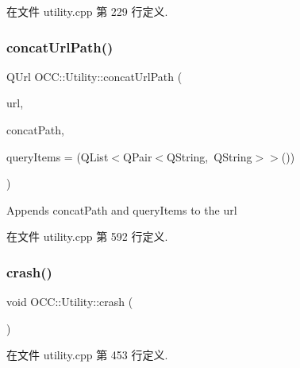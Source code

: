 在文件 utility.\+cpp 第 229 行定义.

\mbox{\label{namespace_o_c_c_1_1_utility_a3032e9927bf9de22576b940b1770008d}} 
\subsubsection{\texorpdfstring{concat\+Url\+Path()}{concatUrlPath()}}
{\footnotesize\ttfamily Q\+Url O\+C\+C\+::\+Utility\+::concat\+Url\+Path (\begin{DoxyParamCaption}\item[{const Q\+Url \&}]{url,  }\item[{const Q\+String \&}]{concat\+Path,  }\item[{const Q\+List$<$ Q\+Pair$<$ Q\+String, Q\+String $>$ $>$ \&}]{query\+Items = {\ttfamily (QList$<$QPair$<$QString,~QString$>$$>$())} }\end{DoxyParamCaption})}

Appends concat\+Path and query\+Items to the url 

在文件 utility.\+cpp 第 592 行定义.

\mbox{\label{namespace_o_c_c_1_1_utility_aecc25c7e7b37a8be13da47b4f550a9e0}} 
\subsubsection{\texorpdfstring{crash()}{crash()}}
{\footnotesize\ttfamily void O\+C\+C\+::\+Utility\+::crash (\begin{DoxyParamCaption}{ }\end{DoxyParamCaption})}



在文件 utility.\+cpp 第 453 行定义.

\mbox{\label{namespace_o_c_c_1_1_utility_adda2449d3e0697cd65366b2e0c2ab4d4}} 
